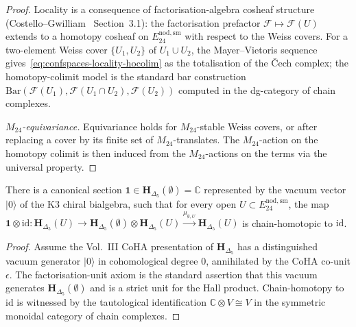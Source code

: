 \begin{proof}
Locality is a consequence of factorisation-algebra cosheaf structure
(Costello--Gwilliam~\cite{CG17} Section~3.1): the factorisation
prefactor $\mathcal{F}\mapsto\mathcal{F}(U)$ extends to a homotopy
cosheaf on $E^{\mathrm{nod,sm}}_{24}$ with respect to the Weiss
covers. For a two-element Weiss cover $\{U_1,U_2\}$ of $U_1\cup U_2$,
the Mayer--Vietoris sequence gives~\eqref{eq:confspaces-locality-hocolim}
as the totalisation of the \v{C}ech complex; the homotopy-colimit
model is the standard bar construction
$\mathrm{Bar}(\mathcal{F}(U_1),\mathcal{F}(U_1\cap U_2),\mathcal{F}(U_2))$
computed in the dg-category of chain complexes.

\emph{$M_{24}$-equivariance.} Equivariance holds for $M_{24}$-stable
Weiss covers, or after replacing a cover by its finite set of
$M_{24}$-translates. The $M_{24}$-action on the homotopy colimit is then
induced from the $M_{24}$-actions on the terms via the universal
property.
\end{proof}

\begin{proposition}
\label{prop:confspaces-unit-axiom}
\ClaimStatusConditional
There is a canonical section $\mathbf{1}\in\mathbf{H}_{\Delta_5}(\emptyset)
= \mathbb{C}$ represented by the vacuum vector $|0\rangle$ of the K3
chiral bialgebra, such that for every open $U\subset E^{\mathrm{nod,sm}}_{24}$,
the map $\mathbf{1}\otimes\mathrm{id}\colon\mathbf{H}_{\Delta_5}(U)
\to\mathbf{H}_{\Delta_5}(\emptyset)\otimes\mathbf{H}_{\Delta_5}(U)
\xrightarrow{\mu_{\emptyset,U}}\mathbf{H}_{\Delta_5}(U)$ is chain-homotopic
to $\mathrm{id}$.
\end{proposition}

\begin{proof}
Assume the Vol.~III CoHA presentation of $\mathbf{H}_{\Delta_5}$ has a
distinguished
vacuum generator $|0\rangle$ in cohomological degree $0$, annihilated
by the CoHA co-unit $\epsilon$. The factorisation-unit axiom is the
standard assertion that this vacuum generates
$\mathbf{H}_{\Delta_5}(\emptyset)$ and is a strict unit for the Hall
product. Chain-homotopy to $\mathrm{id}$ is witnessed by the
tautological identification $\mathbb{C}\otimes V\cong V$ in the
symmetric monoidal category of chain complexes.
\end{proof}

